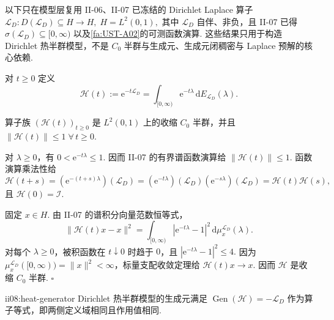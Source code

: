 以下只在模型层复用 II-06、II-07 已冻结的 Dirichlet Laplace 算子
\(\displaystyle \mathcal L_D:D(\mathcal L_D)\subseteq H\to H,\; H=L^2(0,1),\)
其中 \(\displaystyle\mathcal L_D\) 自伴、非负，且 II-07 已得 \(\displaystyle\sigma(\mathcal L_D)\subseteq[0,\infty)\) 以及\autoref{fa:UST-A02}的可测函数演算. 这些结果只用于构造 Dirichlet 热半群模型，不是 \(\displaystyle C_0\) 半群与生成元、生成元闭稠密与 Laplace 预解的核心依赖.

对 \(\displaystyle t\geqslant0\) 定义
\[
\mathcal H(t)
:=
\mathrm{e}^{-t\mathcal L_D}
=
\int_{[0,\infty)}\mathrm{e}^{-t\lambda}\,\mathrm{d}E_{\mathcal L_D}(\lambda).
\]

\begin{FAExample}\label{ii08:heat-semigroup}
算子族 \(\displaystyle(\mathcal H(t))_{t\geqslant0}\) 是 \(\displaystyle L^2(0,1)\) 上的收缩 \(\displaystyle C_0\) 半群，并且
\(\displaystyle \|\mathcal H(t)\|\leqslant1 \; \forall\,t\geqslant0.\)
\end{FAExample}

\begin{FAProof}
对 \(\displaystyle\lambda\geqslant0\)，有 \(\displaystyle0<\mathrm{e}^{-t\lambda}\leqslant1\). 因而 II-07 的有界谱函数演算给 \(\displaystyle\|\mathcal H(t)\|\leqslant1\). 函数演算乘法性给
\[
\mathcal H(t+s)
=
(\mathrm{e}^{-(t+s)\lambda})(\mathcal L_D)
=
(\mathrm{e}^{-t\lambda})(\mathcal L_D)(\mathrm{e}^{-s\lambda})(\mathcal L_D)
=
\mathcal H(t)\mathcal H(s),
\]
且 \(\displaystyle\mathcal H(0)=\mathcal I\).

固定 \(\displaystyle x\in H\). 由 II-07 的谱积分向量范数恒等式，
\[
\|\mathcal H(t)x-x\|^2
=
\int_{[0,\infty)}
|\mathrm{e}^{-t\lambda}-1|^2
\,\mathrm{d}\mu_x^{\mathcal L_D}(\lambda).
\]
对每个 \(\displaystyle\lambda\geqslant0\)，被积函数在 \(\displaystyle t\downarrow0\) 时趋于 \(\displaystyle0\)，且
\(\displaystyle |\mathrm{e}^{-t\lambda}-1|^2\leqslant4.\)
因为 \(\displaystyle\mu_x^{\mathcal L_D}([0,\infty))=\|x\|^2<\infty\)，标量支配收敛定理给 \(\displaystyle\mathcal H(t)x\to x\). 因而 \(\displaystyle\mathcal H\) 是收缩 \(\displaystyle C_0\) 半群.
\hfill\(\square\)
\end{FAProof}

\begin{FAProposition}[B][热半群生成元的精确识别]{ii08:heat-generator}
Dirichlet 热半群模型的生成元满足
\(\displaystyle \operatorname{Gen}(\mathcal H) = -\mathcal L_D\)
作为算子等式，即两侧定义域相同且作用值相同.
\end{FAProposition}

